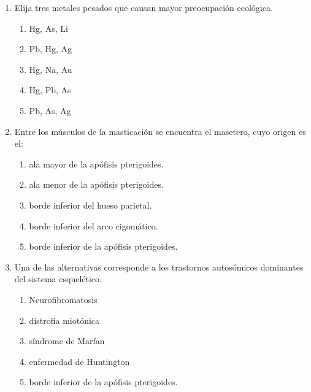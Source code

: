 \begin{enumerate}
	I. Son átomos que tienen propiedades químicas idénticas.\\
	II. Son átomos que tienen propiedades físicas diferentes.\\
	III. Todo elemento posee dos o más isótopos naturales, además de ser estables.\\
	IV. Poseen diferente número de nucleones fundamentales.\\
	V. El isótopo más abundante en la naturaleza es el de menor número de masa.
	
	\begin{enumerate}[label=\alph*)]
		\item FVVFF
		\item VVFVV
		\item FFVFF
		\item FFFVV
		\item VFVVV
	\end{enumerate}
	
	\item Elija tres metales pesados que causan mayor preocupación ecológica.
	\begin{enumerate}[label=\alph*)]
		\item Hg, As, Li
		\item Pb, Hg, Ag
		\item Hg, Na, Au
		\item Hg, Pb, As
		\item Pb, As, Ag
	\end{enumerate}
	
	\item Entre los músculos de la masticación se encuentra el masetero, cuyo origen es el:
	\begin{enumerate}[label=\alph*)]
		\item ala mayor de la apófisis pterigoides.
		\item ala menor de la apófisis pterigoides.
		\item borde inferior del hueso parietal.
		\item borde inferior del arco cigomático.
		\item borde inferior de la apófisis pterigoides.
	\end{enumerate}
	
	\item Una de las alternativas corresponde a los trastornos autosómicos dominantes del sistema esquelético.
	\begin{enumerate}[label=\alph*)]
		\item Neurofibromatosis
		\item distrofia miotónica
		\item síndrome de Marfan
		\item enfermedad de Huntington
		\item borde inferior de la apófisis pterigoides.
	\end{enumerate}
	

\end{enumerate}
